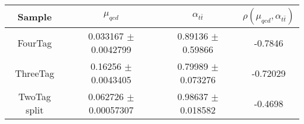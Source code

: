 \begin{footnotesize} 
\begin{tabular}{c|c|c|c} 
Sample & $\mu_{qcd}$ & $\alpha_{t\bar{t}}$ & $\rho(\mu_{qcd}, \alpha_{t\bar{t}})$ \\ 
\hline\hline 
FourTag & 0.033167 $\pm$ 0.0042799 & 0.89136 $\pm$ 0.59866 & -0.7846\\
ThreeTag & 0.16256 $\pm$ 0.0043405 & 0.79989 $\pm$ 0.073276 & -0.72029\\
TwoTag split & 0.062726 $\pm$ 0.00057307 & 0.98637 $\pm$ 0.018582 & -0.4698\\
\hline\hline 
\end{tabular} 
\end{footnotesize} 
\newline 
